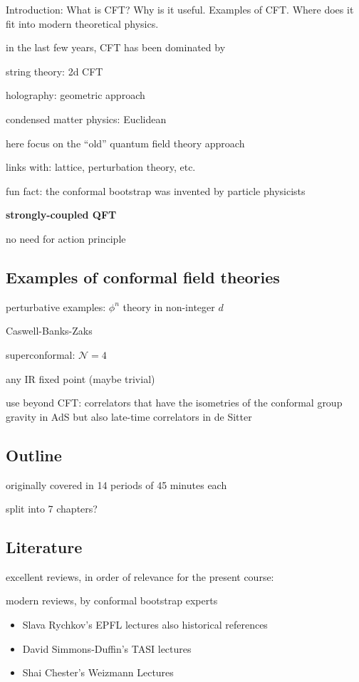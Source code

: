 \documentclass[a4paper,12pt]{article}
\numberwithin{equation}{section}
\begin{document}
Introduction: What is CFT? Why is it useful. Examples of CFT. Where does it fit into modern theoretical physics.


in the last few years, CFT has been dominated by 

string theory: 2d CFT

holography: geometric approach

condensed matter physics: Euclidean


here focus on the ``old'' quantum field theory approach

links with: lattice, perturbation theory, etc.

fun fact: the conformal bootstrap was invented by particle physicists


\textbf{strongly-coupled QFT}

no need for action principle


\subsection{Examples of conformal field theories}

perturbative examples: $\phi^n$ theory in non-integer $d$

Caswell-Banks-Zaks

superconformal: $\mathcal{N} = 4$


any IR fixed point (maybe trivial)


use beyond CFT:
correlators that have the isometries of the conformal group
gravity in AdS
but also late-time correlators in de Sitter

\subsection{Outline}

originally covered in 14 periods of 45 minutes each

split into 7 chapters?


\subsection{Literature}


excellent reviews, in order of relevance for the present course:


modern reviews, by conformal bootstrap experts
\begin{itemize}

\item
Slava Rychkov's EPFL lectures
\cite{Rychkov:2016iqz}
also historical references

\item
David Simmons-Duffin's TASI lectures
\cite{Simmons-Duffin:2016gjk}

\item
Shai Chester's Weizmann Lectures
\cite{Chester:2019wfx}


\end{itemize}
\end{document}
